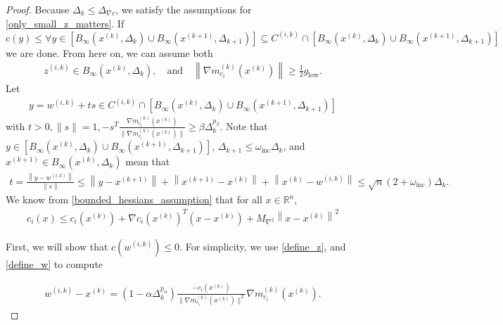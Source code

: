 \documentclass{article}
\theoremstyle{case}
\numberwithin{theorem}{subsection}
\newcommand{\dk}{\Delta_k}
\newcommand{\dkpo}{\Delta_{k+1}}
\newcommand{\gmcik}{{\nabla m_{c_i}^{(k)}\left(\xk\right)}}
\newcommand{\hgik}{{\frac{\nabla m^{(k)}_{c_i}(\xk)}{\|\nabla m^{(k)}_{c_i}\left(\xk\right)\|}}}
\newcommand{\maxhessian}{{M_{\nabla^2}}}
\newcommand{\mingraddelta}{{\Delta_{\nabla c}}}
\newcommand{\mingrad}{{ g_{\textrm{low}} }}
\newcommand{\omegainc}{\omega_{\text{inc}}}
\newcommand{\Rn}{\mathbb R^n}
\newcommand{\tr}{{ B_{\infty}\left(\xk, \dk\right) }}
\newcommand{\trkpo}{{ B_{\infty}\left(\xkpo, \dkpo\right) }}
\newcommand{\wik}{{w^{(i, k)}}}
\newcommand{\xkpo}{{{x}^{(k+1)}}}
\newcommand{\xk}{x^{(k)}}
\newcommand{\zik}{{z^{(i, k)}}}
\newcommand{\fik}{{C^{(i, k)}}}
\begin{document}
\begin{proof}
Because $\dk \le \mingraddelta$, we satisfy the assumptions for \cref{only_small_z_matters}.
If $c(y) \le \forall y \in \left[\tr \cup \trkpo\right] \subseteq \fik \cap \left[\tr \cup \trkpo\right]$ we are done.
From here on, we can assume both
\begin{align}
\zik \in \tr, \quad \textrm{and} \quad \left\|\gmcik\right\| \ge \frac 1 2 \mingrad. \label{z_is_active}
\end{align}
Let
\begin{align}
y = \wik + ts \in \fik \cap \left[\tr \cup \trkpo\right] \label{t_is_bounded}
\end{align}
with $t > 0, \|s\| = 1, -s^T\hgik \ge \beta \dk^{p_{\beta}}$.
Note that $y \in \left[\tr \cup \trkpo\right]$, $\dkpo \le \omegainc\dk$, and $\xkpo \in \tr$ mean that
\begin{align}
\label{eccif_bound_t}
t = \frac{\left\|y - \wik\right\|}{\left\|s\right\|} 
\le \left\|y - \xkpo\right\| + \left\|\xkpo - \xk\right\| + \left\|\xk - \wik\right\|
\le \sqrt{n}\left(2 + \omegainc \right)\dk.
\end{align}
We know from \cref{bounded_hessians_assumption} that for all $x \in \Rn$,
\begin{align}
c_i(x) \le c_i(\xk) + \nabla c_i(\xk)^T(x - \xk) + \maxhessian \left \|x - \xk \right\|^2 \label{constraint_lower_bound}
\end{align}

First, we will show that $c(\wik) \le 0$.
For simplicity, we use \cref{define_z}, and \cref{define_w} to compute


\begin{align}
\wik - \xk = \left(1 - \alpha \dk^{p_{\alpha} }\right)\frac{-c_i(\xk)}{\|\gmcik\|^2}\gmcik. \label{simple_computation}
\end{align}


\end{proof}
\end{document}
